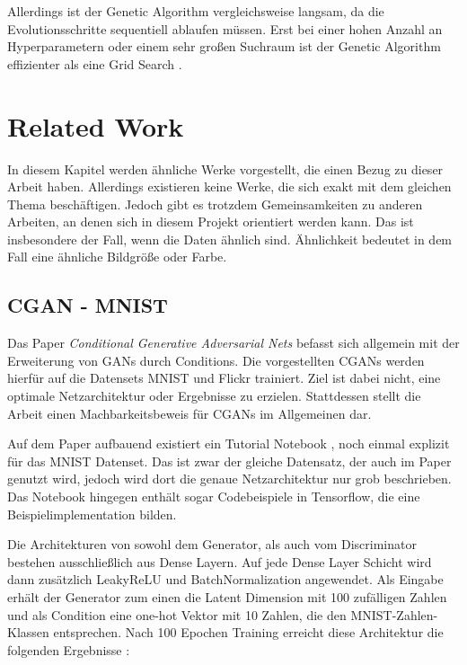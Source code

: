 Allerdings ist der Genetic Algorithm vergleichsweise langsam, da die Evolutionsschritte sequentiell ablaufen müssen.
Erst bei einer hohen Anzahl an Hyperparametern oder einem sehr großen Suchraum ist der Genetic Algorithm effizienter als eine Grid Search \cite{hyperparameters-search-comparison-focus-genetic}.

\section{Related Work}
\label{chapter:related-work}
In diesem Kapitel werden ähnliche Werke vorgestellt, die einen Bezug zu dieser Arbeit haben.
Allerdings existieren keine Werke, die sich exakt mit dem gleichen Thema beschäftigen.
Jedoch gibt es trotzdem Gemeinsamkeiten zu anderen Arbeiten, an denen sich in diesem Projekt orientiert werden kann.
Das ist insbesondere der Fall, wenn die Daten ähnlich sind.
Ähnlichkeit bedeutet in dem Fall eine ähnliche Bildgröße oder Farbe.

\subsection{CGAN - MNIST}
Das Paper \textit{Conditional Generative Adversarial Nets} \cite{mirza2014conditional} befasst sich allgemein mit der Erweiterung von GANs durch Conditions. 
Die vorgestellten CGANs werden hierfür auf die Datensets MNIST und Flickr trainiert.
Ziel ist dabei nicht, eine optimale Netzarchitektur oder Ergebnisse zu erzielen.
Stattdessen stellt die Arbeit einen Machbarkeitsbeweis für CGANs im Allgemeinen dar.
\newline

Auf dem Paper aufbauend existiert ein Tutorial Notebook \cite{cgan-tutorial-notebook}, noch einmal explizit für das MNIST Datenset.
Das ist zwar der gleiche Datensatz, der auch im Paper genutzt wird, jedoch wird dort die genaue Netzarchitektur nur grob beschrieben.
Das Notebook hingegen enthält sogar Codebeispiele in Tensorflow, die eine Beispielimplementation bilden.
\newline

Die Architekturen von sowohl dem Generator, als auch vom Discriminator bestehen ausschließlich aus Dense Layern.
Auf jede Dense Layer Schicht wird dann zusätzlich LeakyReLU und BatchNormalization angewendet.
Als Eingabe erhält der Generator zum einen die Latent Dimension mit 100 zufälligen Zahlen und als Condition eine one-hot Vektor mit 10 Zahlen, die den MNIST-Zahlen-Klassen entsprechen.
Nach 100 Epochen Training erreicht diese Architektur die folgenden Ergebnisse :

